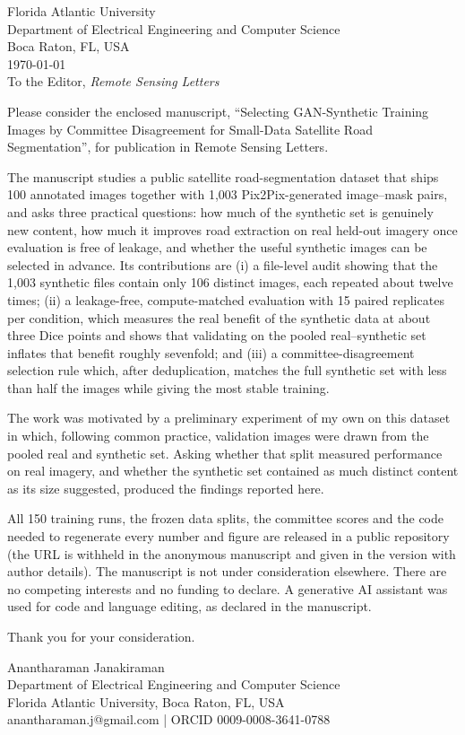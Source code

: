\documentclass[11pt]{article}
\begin{document}
\noindent Florida Atlantic University\\
Department of Electrical Engineering and Computer Science\\
Boca Raton, FL, USA\\[6pt]
\today\\[12pt]
\noindent To the Editor, \emph{Remote Sensing Letters}
\vspace{6pt}

Please consider the enclosed manuscript, ``Selecting GAN-Synthetic Training Images by Committee Disagreement for Small-Data Satellite Road Segmentation'', for publication in Remote Sensing Letters.

The manuscript studies a public satellite road-segmentation dataset that ships 100 annotated images together with 1,003 Pix2Pix-generated image--mask pairs, and asks three practical questions: how much of the synthetic set is genuinely new content, how much it improves road extraction on real held-out imagery once evaluation is free of leakage, and whether the useful synthetic images can be selected in advance. Its contributions are (i) a file-level audit showing that the 1,003 synthetic files contain only 106 distinct images, each repeated about twelve times; (ii) a leakage-free, compute-matched evaluation with 15 paired replicates per condition, which measures the real benefit of the synthetic data at about three Dice points and shows that validating on the pooled real--synthetic set inflates that benefit roughly sevenfold; and (iii) a committee-disagreement selection rule which, after deduplication, matches the full synthetic set with less than half the images while giving the most stable training.

The work was motivated by a preliminary experiment of my own on this dataset in which, following common practice, validation images were drawn from the pooled real and synthetic set. Asking whether that split measured performance on real imagery, and whether the synthetic set contained as much distinct content as its size suggested, produced the findings reported here.

All 150 training runs, the frozen data splits, the committee scores and the code needed to regenerate every number and figure are released in a public repository (the URL is withheld in the anonymous manuscript and given in the version with author details). The manuscript is not under consideration elsewhere. There are no competing interests and no funding to declare. A generative AI assistant was used for code and language editing, as declared in the manuscript.

Thank you for your consideration.

Anantharaman Janakiraman\\
Department of Electrical Engineering and Computer Science\\
Florida Atlantic University, Boca Raton, FL, USA\\
anantharaman.j@gmail.com | ORCID 0009-0008-3641-0788
\end{document}
